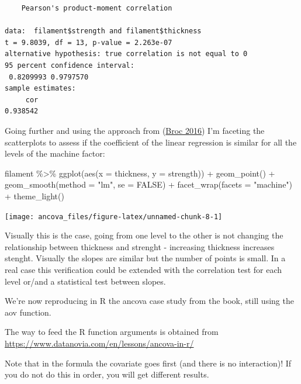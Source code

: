 \documentclass[
]{book}
\newenvironment{Shaded}{\begin{snugshade}}{\end{snugshade}}
\newcommand{\AttributeTok}[1]{\textcolor[rgb]{0.77,0.63,0.00}{#1}}
\newcommand{\ConstantTok}[1]{\textcolor[rgb]{0.00,0.00,0.00}{#1}}
\newcommand{\FunctionTok}[1]{\textcolor[rgb]{0.00,0.00,0.00}{#1}}
\newcommand{\NormalTok}[1]{#1}
\newcommand{\SpecialCharTok}[1]{\textcolor[rgb]{0.00,0.00,0.00}{#1}}
\newcommand{\StringTok}[1]{\textcolor[rgb]{0.31,0.60,0.02}{#1}}
\begin{document}
\begin{verbatim}
	Pearson's product-moment correlation

data:  filament$strength and filament$thickness
t = 9.8039, df = 13, p-value = 2.263e-07
alternative hypothesis: true correlation is not equal to 0
95 percent confidence interval:
 0.8209993 0.9797570
sample estimates:
     cor 
0.938542 
\end{verbatim}

Going further and using the approach from (\protect\hyperlink{ref-Broc2016}{Broc 2016}) I'm faceting the scatterplots to assess if the coefficient of the linear regression is similar for all the levels of the machine factor:

\begin{Shaded}
\begin{Highlighting}[]
\NormalTok{filament }\SpecialCharTok{\%\textgreater{}\%}
  \FunctionTok{ggplot}\NormalTok{(}\FunctionTok{aes}\NormalTok{(}\AttributeTok{x =}\NormalTok{ thickness, }\AttributeTok{y =}\NormalTok{ strength)) }\SpecialCharTok{+}
  \FunctionTok{geom\_point}\NormalTok{() }\SpecialCharTok{+}
  \FunctionTok{geom\_smooth}\NormalTok{(}\AttributeTok{method =} \StringTok{"lm"}\NormalTok{, }\AttributeTok{se =} \ConstantTok{FALSE}\NormalTok{) }\SpecialCharTok{+}
  \FunctionTok{facet\_wrap}\NormalTok{(}\AttributeTok{facets =} \StringTok{"machine"}\NormalTok{) }\SpecialCharTok{+}
  \FunctionTok{theme\_light}\NormalTok{()}
\end{Highlighting}
\end{Shaded}

\texttt{[image: ancova\_files/figure-latex/unnamed-chunk-8-1]}

Visually this is the case, going from one level to the other is not changing the relationship between thickness and strenght - increasing thickness increases stenght. Visually the slopes are similar but the number of points is small. In a real case this verification could be extended with the correlation test for each level or/and a statistical test between slopes.

We're now reproducing in R the ancova case study from the book, still using the aov function.

The way to feed the R function arguments is obtained from \url{https://www.datanovia.com/en/lessons/ancova-in-r/}

Note that in the formula the covariate goes first (and there is no interaction)! If you do not do this in order, you will get different results.
\end{document}
